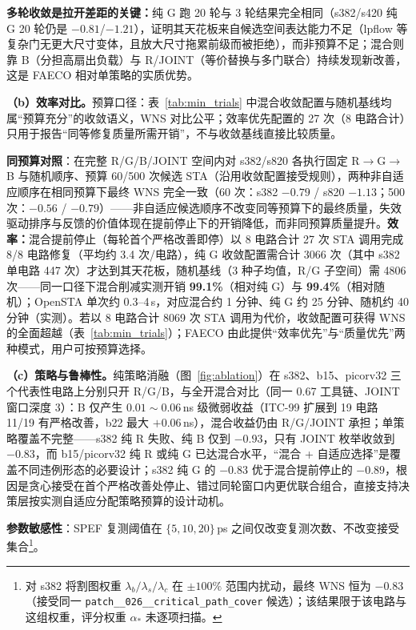 \documentclass[journal]{IEEEtran}
\begin{document}
\textbf{多轮收敛是拉开差距的关键：}纯 G 跑 20 轮与 3 轮结果完全相同（s382/s420 纯 G 20 轮仍是 $-0.81$/$-1.21$），证明其天花板来自候选空间表达能力不足（lpflow 等复杂门无更大尺寸变体，且放大尺寸拖累前级而被拒绝），而非预算不足；混合则靠 B（分担高扇出负载）与 R/JOINT（等价替换与多门联合）持续发现新改善，这是 FAECO 相对单策略的实质优势。

\textbf{（b）效率对比。}预算口径：表~\ref{tab:min_trials} 中混合收敛配置与随机基线均属“预算充分”的收敛语义，WNS 对比公平；效率优先配置的 27 次（8 电路合计）只用于报告“同等修复质量所需开销”，不与收敛基线直接比较质量。

\textbf{同预算对照}：在完整 R/G/B/JOINT 空间内对 s382/s820 各执行固定 R$\rightarrow$G$\rightarrow$B 与随机顺序、预算 60/500 次候选 STA（沿用收敛配置接受规则），两种非自适应顺序在相同预算下最终 WNS 完全一致（60 次：s382 $-0.79$ / s820 $-1.13$；500 次：$-0.56$ / $-0.79$）——非自适应候选顺序不改变同等预算下的最终质量，失效驱动排序与反馈的价值体现在提前停止下的开销降低，而非同预算质量提升。\textbf{效率：}混合提前停止（每轮首个严格改善即停）以 8 电路合计 27 次 STA 调用完成 8/8 电路修复（平均约 3.4 次/电路），纯 G 收敛配置需合计 3066 次（其中 s382 单电路 447 次）才达到其天花板，随机基线（3 种子均值，R/G 子空间）需 4806 次——同一口径下混合削减实测开销 \textbf{99.1\%}（相对纯 G）与 \textbf{99.4\%}（相对随机）；OpenSTA 单次约 0.3--4\,s，对应混合约 1 分钟、纯 G 约 25 分钟、随机约 40 分钟（实测）。若以 8 电路合计 8069 次 STA 调用为代价，收敛配置可获得 WNS 的全面超越（表~\ref{tab:min_trials}）；FAECO 由此提供“效率优先”与“质量优先”两种模式，用户可按预算选择。

\textbf{（c）策略与鲁棒性。}纯策略消融（图~\ref{fig:ablation}）在 s382、b15、picorv32 三个代表性电路上分别只开 R/G/B，与全开混合对比（同一 0.67 工具链、JOINT 窗口深度 3）：B 仅产生 $0.01\!\sim\!0.06\,$ns 级微弱收益（ITC-99 扩展到 19 电路 11/19 有严格改善，b22 最大 $+0.06\,$ns），混合收益仍由 R/G/JOINT 承担；单策略覆盖不完整——s382 纯 R 失败、纯 B 仅到 $-0.93$，只有 JOINT 枚举收敛到 $-0.83$，而 b15/picorv32 纯 R 或纯 G 已达混合水平，“混合 + 自适应选择”是覆盖不同违例形态的必要设计；s382 纯 G 的 $-0.83$ 优于混合提前停止的 $-0.89$，根因是贪心接受在首个严格改善处停止、错过同轮窗口内更优联合组合，直接支持决策层按实测自适应分配策略预算的设计动机。

\textbf{参数敏感性}：SPEF 复测阈值在 $\{5,10,20\}\,$ps 之间仅改变复测次数、不改变接受集合\footnote{对 s382 将割图权重 $\lambda_b/\lambda_s/\lambda_c$ 在 $\pm 100\%$ 范围内扰动，最终 WNS 恒为 $-0.83$（接受同一 \texttt{patch\_\_026\_\_critical\_path\_cover} 候选）；该结果限于该电路与这组权重，评分权重 $\alpha_*$ 未逐项扫描。}。
\end{document}
